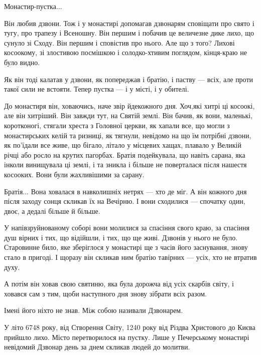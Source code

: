 Монастир-пустка...

Він любив дзвони. Тож і у монастирі допомагав дзвонарям сповіщати про свято і
тугу, про трапезу і Всеношну. Він першим і побачив це величезне дике лихо, що
сунуло зі Сходу. Він першим і сповістив про нього. Але що з того? Лихові
косоокому, зі злостивою посмішкою і солодко-хтивим поглядом, кінця-краю не було
видно.

Як він тоді калатав у дзвони, як попереджав і братію, і паству — всіх, але
проти такої сили не встояти. Тепер пустка — і у місті, і у обителі.

До монастиря він, ховаючись, наче звір йдекожного дня. Хоч,які хитрі ці
косоокі, але він хитріший. Він завжди тут, на Святій землі. Він бачив, як вони,
маленькі, коротконогі, стягали хреста з Головної церкви, як хапали все, що
могли з монастирських келій та ризниці, як тягнули, невідомо на що їм потрібні
дзвони, як по'їдали все живе, що бігало, літало у місцевих хащах, плавало у
Великій річці або росло на крутих пагорбах. Братія подейкувала, що навіть
сарана, яка інколи винищувала ці землі, і та зникла і більше не поверталася
після нашестя косооких. Вони були жахливішими за сарану.

Братія... Вона ховалася в навколишніх нетрях — хто де міг. А він кожного дня
після заходу сонця скликав їх на Вечірню. І вони сходилися — спочатку один,
двоє, а дедалі більше й більше.

У напівзруйнованому соборі вони молилися за спасіння свого краю, за спасіння
душ вірних і тих, що відійшли, і тих, що ще живі. Дзвонів у нього не було.
Старовинне било, яке зберіглося у монастирі ще з часів його заснування, знову
стало в пригоді. І щоразу він скликав ним братію тавірних — усіх, хто не
втратив духу.

А потім він ховав свою святиню, яка була дорожча від усіх скарбів світу, і
ховався сам з тим, щоби наступного дня знову зібрати всіх разом.

Імені його ніхто не знав. Між собою називали Дзвонарем.

У літо 6748 року, від Створення Світу, 1240 року від Різдва Христового до Києва
прийшло лихо. Місто перетворилося на пустку. Лише у Печерському монастирі
невідомий Дзвонар день за днем скликав людей до молитви.
